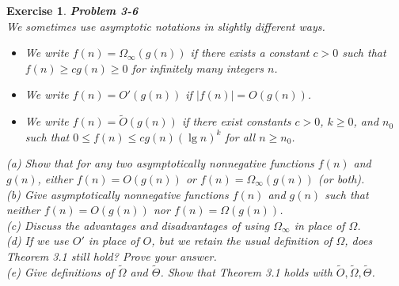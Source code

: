 \documentclass[12pt]{article}
\newtheorem{exercise}[theorem]{Exercise}
\theoremstyle{definition}
\begin{document}
\begin{exercise}
\noindent
\textbf{Problem 3-6} \\
We sometimes use asymptotic notations in slightly different ways.
\begin{itemize}
\item We write $f(n)=\Omega_\infty(g(n))$ if there exists a constant $c>0$ such that $f(n)\ge c g(n)\ge 0$ for infinitely many integers $n$.
\item We write $f(n)=O'(g(n))$ if $|f(n)|=O(g(n))$.
\item We write $f(n)=\tilde{O}(g(n))$ if there exist constants $c>0$, $k\ge 0$, and $n_0$ such that $0\le f(n)\le c g(n)(\lg n)^k$ for all $n\ge n_0$.
\end{itemize}

\noindent
(a) Show that for any two asymptotically nonnegative functions $f(n)$ and $g(n)$, either $f(n)=O(g(n))$ or $f(n)=\Omega_\infty(g(n))$ (or both). \\[4pt]
(b) Give asymptotically nonnegative functions $f(n)$ and $g(n)$ such that neither $f(n)=O(g(n))$ nor $f(n)=\Omega(g(n))$. \\[4pt]
(c) Discuss the advantages and disadvantages of using $\Omega_\infty$ in place of $\Omega$. \\[4pt]
(d) If we use $O'$ in place of $O$, but we retain the usual definition of $\Omega$, does Theorem 3.1 still hold? Prove your answer. \\[4pt]
(e) Give definitions of $\tilde{\Omega}$ and $\tilde{\Theta}$. Show that Theorem 3.1 holds with $\tilde{O}, \tilde{\Omega}, \tilde{\Theta}$.
\end{exercise}
\end{document}
